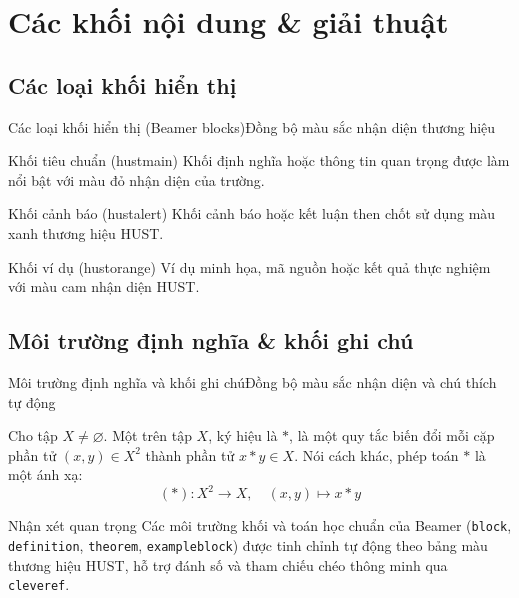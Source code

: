\documentclass[aspectratio=43,10pt]{beamer}
\begin{document}
\section[Giải thuật]{Các khối nội dung \& giải thuật}
\subsection{Các loại khối hiển thị}
\begin{frame}{Các loại khối hiển thị (Beamer blocks)}{Đồng bộ màu sắc nhận diện thương hiệu}
  \begin{block}{Khối tiêu chuẩn (hustmain)}
    Khối định nghĩa hoặc thông tin quan trọng được làm nổi bật với màu đỏ nhận diện của trường.
  \end{block}

  \begin{alertblock}{Khối cảnh báo (hustalert)}
    Khối cảnh báo hoặc kết luận then chốt sử dụng màu xanh thương hiệu HUST.
  \end{alertblock}

  \begin{exampleblock}{Khối ví dụ (hustorange)}
    Ví dụ minh họa, mã nguồn hoặc kết quả thực nghiệm với màu cam nhận diện HUST.
  \end{exampleblock}
\end{frame}

\subsection{Môi trường định nghĩa \& khối ghi chú}
\begin{frame}{Môi trường định nghĩa và khối ghi chú}{Đồng bộ màu sắc nhận diện và chú thích tự động}
  \begin{definition}
    Cho tập $X \neq \varnothing$. Một  trên tập $X$, ký hiệu là $*$, là một quy tắc biến đổi mỗi cặp phần tử $(x, y) \in X^2$ thành phần tử $x * y \in X$. Nói cách khác, phép toán $*$ là một ánh xạ:
    \[
      (*) : X^2 \longrightarrow X, \quad (x, y) \longmapsto x * y
    \]
  \end{definition}

  \begin{exampleblock}{Nhận xét quan trọng}
    \warning Các môi trường khối và toán học chuẩn của Beamer (\texttt{block}, \texttt{definition}, \texttt{theorem}, \texttt{exampleblock}) được tinh chỉnh tự động theo bảng màu thương hiệu HUST, hỗ trợ đánh số và tham chiếu chéo thông minh qua \texttt{cleveref}.
  \end{exampleblock}
\end{frame}
\end{document}

